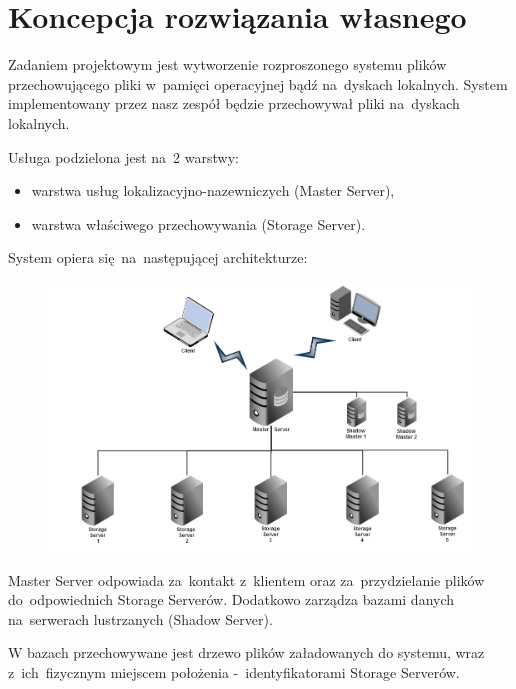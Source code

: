 \chapter[Koncepcja rozwiązania własnego][Koncepcja rozwiązania
własnego]{Koncepcja rozwiązania własnego}
Zadaniem projektowym jest wytworzenie rozproszonego systemu plików
przechowującego pliki w~pamięci operacyjnej bądź na~dyskach lokalnych. System
implementowany przez nasz zespół będzie przechowywał pliki na~dyskach lokalnych.

\vspace{5mm}
Usługa podzielona jest na~2 warstwy:
\begin{itemize}
  \item warstwa usług lokalizacyjno-nazewniczych (Master Server),
  \item warstwa właściwego przechowywania (Storage Server).
\end{itemize}

\vspace{5mm}
System opiera się~na~następującej architekturze:
\begin{figure}[H]
\center
\flushleft
\includegraphics[keepaspectratio=true, scale=0.45]{img/own_conception.png}
\end{figure}

\vspace{5mm}
Master Server odpowiada za~kontakt z~klientem oraz za~przydzielanie plików
do~odpowiednich Storage Serverów. Dodatkowo zarządza bazami danych na~serwerach
lustrzanych (Shadow Server).

\vspace{5mm}
W bazach przechowywane jest drzewo plików załadowanych do systemu, wraz
z~ich~fizycznym miejscem położenia -~identyfikatorami Storage Serverów.

